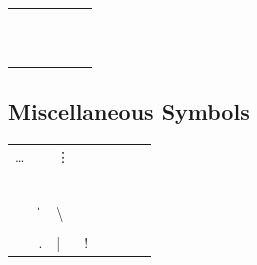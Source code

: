 \documentclass[11pt, a4paper, oneside]{article}
\theoremstyle{Plain}
\theoremstyle{Definition}
\theoremstyle{Remark}
\begin{document}
\begin{appendix}
	\begin{tabular}{*6l}
	\X\leftarrow            &\X\longleftarrow       &\X\uparrow     \\
	\X\Leftarrow            &\X\Longleftarrow       &\X\Uparrow     \\
	\X\rightarrow           &\X\longrightarrow      &\X\downarrow   \\
	\X\Rightarrow           &\X\Longrightarrow      &\X\Downarrow   \\
	\X\leftrightarrow       &\X\longleftrightarrow  &\X\updownarrow \\
	\X\Leftrightarrow       &\X\Longleftrightarrow  &\X\Updownarrow \\
	\X\mapsto               &\X\longmapsto          &\X\nearrow     \\
	\X\hookleftarrow        &\X\hookrightarrow      &\X\searrow     \\
	\X\leftharpoonup        &\X\rightharpoonup      &\X\swarrow     \\
	\X\leftharpoondown      &\X\rightharpoondown    &\X\nwarrow     \\
	\X\rightleftharpoons    &\X\leadsto
	\end{tabular}

	\subsection{Miscellaneous Symbols \showfamily}

	\begin{tabular}{*8l}
	\X\ldots        &\X\cdots       &\X\vdots       &\X\ddots       \\
	\X\aleph        &\X\prime       &\X\forall      &\X\infty       \\
	\X\hbar         &\X\emptyset    &\X\exists      &\X\Box         \\
	\X\imath        &\X\nabla       &\X\neg         &\X\Diamond     \\
	\X\jmath        &\X\surd        &\X\flat        &\X\triangle    \\
	\X\ell          &\X\top         &\X\natural     &\X\clubsuit    \\
	\X\wp           &\X\bot         &\X\sharp       &\X\diamondsuit \\
	\X\Re           &\X\|           &\X\backslash   &\X\heartsuit   \\
	\X\Im           &\X\angle       &\X\partial     &\X\spadesuit   \\
	\X\mho          &\X.            &\X|            &\X!
	\end{tabular}


\end{appendix}
\end{document}
